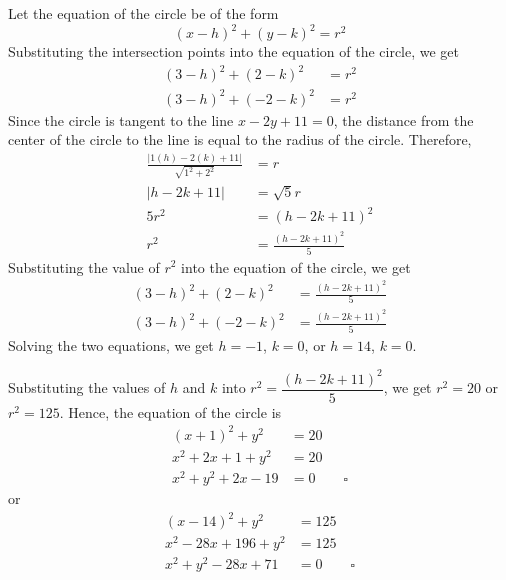 \documentclass{report}
\newcommand{\eos}{ \qquad \square}
\begin{document}
\begin{enumerate}
\begin{enumerate}
                    Let the equation of the circle be of the form
                    \begin{equation*}
                        (x - h)^2 + (y - k)^2 = r^2
                    \end{equation*}
                    Substituting the intersection points into the equation of the circle, we get
                    \begin{align*}
                        (3 - h)^2 + (2 - k)^2  & = r^2 \\
                        (3 - h)^2 + (-2 - k)^2 & = r^2
                    \end{align*}
                    Since the circle is tangent to the line $x - 2y + 11 = 0$, the distance from the center of the circle to the line is equal to the radius of the circle. Therefore,
                    \begin{align*}
                        \frac{|1(h) - 2(k) + 11|}{\sqrt{1^2 + 2^2}} & = r                         \\
                        |h - 2k + 11|                               & = \sqrt{5}r                 \\
                        5r^2                                        & = (h - 2k + 11)^2           \\
                        r^2                                         & = \frac{(h - 2k + 11)^2}{5}
                    \end{align*}
                    Substituting the value of $r^2$ into the equation of the circle, we get
                    \begin{align*}
                        (3 - h)^2 + (2 - k)^2  & = \frac{(h - 2k + 11)^2}{5} \\
                        (3 - h)^2 + (-2 - k)^2 & = \frac{(h - 2k + 11)^2}{5}
                    \end{align*}
                    Solving the two equations, we get $h = -1$, $k = 0$, or $h = 14$, $k = 0$.

                    \newpage
                    Substituting the values of $h$ and $k$ into $r^2 = \dfrac{(h - 2k + 11)^2}{5}$,
                    we get $r^2 = 20$ or $r^2 = 125$. Hence, the equation of the circle is
                    \begin{align*}
                        (x + 1)^2 + y^2     & = 20     \\
                        x^2 + 2x + 1 + y^2  & = 20     \\
                        x^2 + y^2 + 2x - 19 & = 0 \eos
                    \end{align*}
                    or
                    \begin{align*}
                        (x - 14)^2 + y^2      & = 125    \\
                        x^2 - 28x + 196 + y^2 & = 125    \\
                        x^2 + y^2 - 28x + 71  & = 0 \eos
                    \end{align*}
          \end{enumerate}


\end{enumerate}
\end{document}
